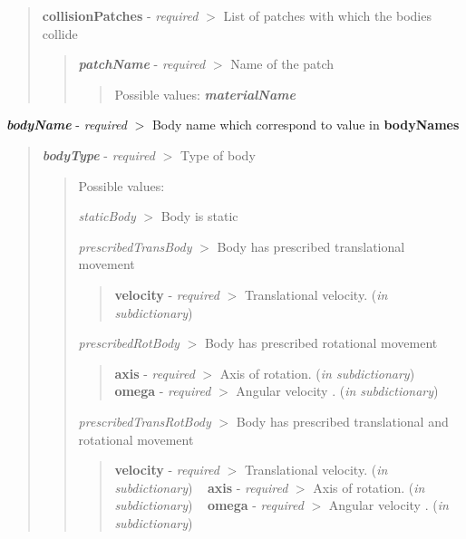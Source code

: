 \begin{quote}
{\bfseries{collision\+Patches}} -\/ {\itshape required} $>$ List of patches with which the bodies collide ~\newline
 \begin{quote}
{\itshape {\bfseries{patch\+Name}}} -\/ {\itshape required} $>$ Name of the patch \begin{quote}
Possible values\+: {\itshape {\bfseries{material\+Name}}} \end{quote}
\end{quote}
\end{quote}


{\itshape {\bfseries{body\+Name}}} -\/ {\itshape required} $>$ Body name which correspond to value in {\bfseries{body\+Names}}

\begin{quote}
{\itshape {\bfseries{body\+Type}}} -\/ {\itshape required} $>$ Type of body \begin{quote}
Possible values\+:
\begin{DoxyItemize}
\item {\itshape static\+Body} $>$ Body is static
\item {\itshape prescribed\+Trans\+Body} $>$ Body has prescribed translational movement \begin{quote}
{\bfseries{velocity}} -\/ {\itshape required} $>$ Translational velocity. ({\itshape in subdictionary}) \end{quote}

\item {\itshape prescribed\+Rot\+Body} $>$ Body has prescribed rotational movement \begin{quote}
{\bfseries{axis}} -\/ {\itshape required} $>$ Axis of rotation. ({\itshape in subdictionary}) ~\newline
 {\bfseries{omega}} -\/ {\itshape required} $>$ Angular velocity . ({\itshape in subdictionary}) \end{quote}

\item {\itshape prescribed\+Trans\+Rot\+Body} $>$ Body has prescribed translational and rotational movement \begin{quote}
{\bfseries{velocity}} -\/ {\itshape required} $>$ Translational velocity. ({\itshape in subdictionary}) ~\newline
 {\bfseries{axis}} -\/ {\itshape required} $>$ Axis of rotation. ({\itshape in subdictionary}) ~\newline
 {\bfseries{omega}} -\/ {\itshape required} $>$ Angular velocity . ({\itshape in subdictionary}) \end{quote}


\end{DoxyItemize}
\end{quote}
\end{quote}
